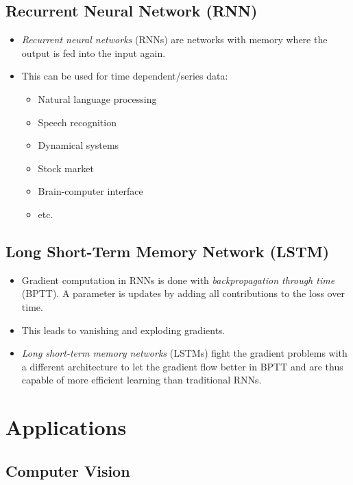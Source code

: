 		\subsection{Recurrent Neural Network (RNN)}
			\begin{itemize}
				\item \emph{Recurrent neural networks} (RNNs) are networks with memory where the output is fed into the input again.
				\item This can be used for time dependent/series data:
					\begin{itemize}
						\item Natural language processing
						\item Speech recognition
						\item Dynamical systems
						\item Stock market
						\item Brain-computer interface
						\item etc.
					\end{itemize}
			\end{itemize}

		\subsection{Long Short-Term Memory Network (LSTM)}
			\begin{itemize}
				\item Gradient computation in RNNs is done with \emph{backpropagation through time} (BPTT). A parameter is updates by adding all contributions to the loss over time.
				\item This leads to vanishing and exploding gradients.
				\item \emph{Long short-term memory networks} (LSTMs) fight the gradient problems with a different architecture to let the gradient flow better in BPTT and are thus capable of more efficient learning than traditional RNNs.
			\end{itemize}

	\section{Applications} %

		\subsection{Computer Vision} %

